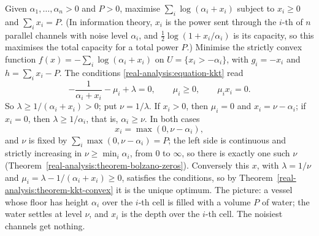 \begin{example}\label{real-analysis:example-water-filling}
Given $\alpha_1, \ldots, \alpha_n > 0$ and $P > 0$, maximise $\sum_i\log(\alpha_i + x_i)$ subject to $x_i \geq 0$ and $\sum_ix_i = P$. (In information theory, $x_i$ is the power sent through the $i$-th of
$n$ parallel channels with noise level $\alpha_i$, and $\frac12\log(1 + x_i/\alpha_i)$ is its capacity, so this maximises the total capacity for a total power $P$.) Minimise the strictly convex function
$f(x) = -\sum_i\log(\alpha_i + x_i)$ on $U = \{x_i > -\alpha_i\}$, with $g_i = -x_i$ and $h = \sum_ix_i - P$. The conditions \eqref{real-analysis:equation-kkt} read
\[
-\frac{1}{\alpha_i + x_i} - \mu_i + \lambda = 0, \qquad \mu_i \geq 0, \qquad \mu_ix_i = 0.
\]
So $\lambda \geq 1/(\alpha_i + x_i) > 0$; put $\nu = 1/\lambda$. If $x_i > 0$, then $\mu_i = 0$ and $x_i = \nu - \alpha_i$; if $x_i = 0$, then $\lambda \geq 1/\alpha_i$, that is, $\alpha_i \geq \nu$. In both cases
\[
x_i = \max(0, \nu - \alpha_i),
\]
and $\nu$ is fixed by $\sum_i\max(0, \nu - \alpha_i) = P$; the left side is continuous and strictly increasing in $\nu \geq \min_i\alpha_i$, from $0$ to $\infty$, so there is exactly one such $\nu$
(Theorem~\ref{real-analysis:theorem-bolzano-zeros}). Conversely this $x$, with $\lambda = 1/\nu$ and $\mu_i = \lambda - 1/(\alpha_i + x_i) \geq 0$, satisfies the conditions, so by
Theorem~\ref{real-analysis:theorem-kkt-convex} it is the unique optimum. The picture: a vessel whose floor has height $\alpha_i$ over the $i$-th cell is filled with a volume $P$ of water; the water
settles at level $\nu$, and $x_i$ is the depth over the $i$-th cell. The noisiest channels get nothing.
\end{example}

